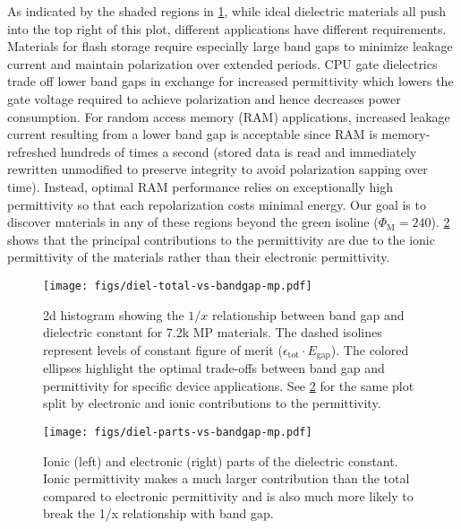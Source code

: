 \documentclass{article}
\newcommand{\fom}[1][]{\Phi_\text{M#1}}
\newcommand{\egap}{{E_\text{gap}}}
\newcommand{\epstot}{\epsilon_\text{tot}}
\begin{document}
As indicated by the shaded regions in \cref{fig:diel-total-vs-bandgap-mp}, while ideal dielectric materials all push into the top right of this plot, different applications have different requirements.
Materials for flash storage require especially large band gaps to minimize leakage current and maintain polarization over extended periods.
CPU gate dielectrics trade off lower band gaps in exchange for increased permittivity which lowers the gate voltage required to achieve polarization and hence decreases power consumption.
For random access memory (RAM) applications, increased leakage current resulting from a lower band gap is acceptable since RAM is memory-refreshed hundreds of times a second (stored data is read and immediately rewritten unmodified to preserve integrity to avoid polarization sapping over time).
Instead, optimal RAM performance relies on exceptionally high permittivity so that each repolarization costs minimal energy.
Our goal is to discover materials in any of these regions beyond the green isoline ($\fom = 240$).
\cref{fig:diel-parts-vs-bandgap-mp} shows that the principal contributions to the permittivity are due to the ionic permittivity of the materials rather than their electronic permittivity.

\begin{figure}
    \centering
    \texttt{[image: figs/diel-total-vs-bandgap-mp.pdf]}
    \caption{2d histogram showing the $1/x$ relationship between band gap and dielectric constant for 7.2k MP materials. The dashed isolines represent levels of constant figure of merit ($\epstot \cdot \egap$). The colored ellipses highlight the optimal trade-offs between band gap and permittivity for specific device applications. See \cref{fig:diel-parts-vs-bandgap-mp} for the same plot split by electronic and ionic contributions to the permittivity.}
    \label{fig:diel-total-vs-bandgap-mp}
\end{figure}

\begin{figure}[ht!]
    \centering
    \texttt{[image: figs/diel-parts-vs-bandgap-mp.pdf]}
    \caption{
        Ionic (left) and electronic (right) parts of the dielectric constant.
        Ionic permittivity makes a much larger contribution than the total compared to electronic permittivity and is also much more likely to break the 1/x relationship with band gap.
    }
    \label{fig:diel-parts-vs-bandgap-mp}
\end{figure}

\clearpage
\end{document}
